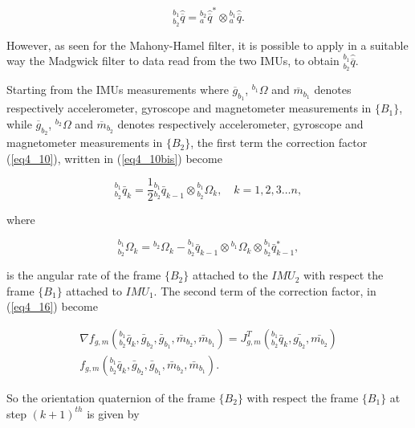 \begin{equation}
\label{eq4_18}
{^{b_1}_{b_2}\hat{\overline{q}}} = {_{a}^{b_2}\hat{\overline{q}}^{*}} \otimes {_{a}^{b_1}\hat{\overline{q}}}.
\end{equation}   

However, as seen for the Mahony-Hamel filter, it is possible to apply in a suitable way the Madgwick filter to data read from the two IMUs, to obtain ${^{b_1}_{b_2}\hat{\overline{q}}}$.

Starting from the IMUs measurements where $\overline{g}_{b_1}$, $^{b_1} \Omega$ and $\overline{m}_{b_1}$ denotes respectively accelerometer, gyroscope and magnetometer measurements in $\{ B_1 \}$,  while $\overline{g}_{b_2}$, $^{b_2} \Omega$ and $\overline{m}_{b_2}$ denotes respectively accelerometer, gyroscope and magnetometer measurements in $\{ B_2 \}$, the first term the correction factor (\ref{eq4_10}), written in (\ref{eq4_10bis}) become

\begin{equation}
\label{eq4_19}
^{b_1}_{b_2} \bar{q}_k = \frac{1}{2} {^{b_1}_{b_2} \bar{q}_{k-1}} \otimes {^{b_1}_{b_2} \Omega_k},  \quad k = 1,2,3 \dots n,
\end{equation}

\noindent where 

\begin{equation}
\label{eq4_20}
{^{b_1}_{b_2} \Omega_k} = {^{b_2} \Omega_k} - {^{b_1}_{b_2} \bar{q}_{k-1}} \otimes {^{b_1} \Omega_k} \otimes {^{b_1}_{b_2} \bar{q}^{*}_{k-1}},
\end{equation}

\noindent is the angular rate of the frame $\{ B_2 \}$ attached to the $IMU_2$ with respect the frame $\{ B_1 \}$ attached to $IMU_1$. The second term of the correction factor, in (\ref{eq4_16}) become

\begin{equation}
\begin{split}
\label{eq4_21}
\nabla f_{g,m}(^{b_1}_{b_2} \bar{q}_k,\bar{g}_{b_2},\bar{g}_{b_1},\bar{m}_{b_2},\bar{m}_{b_1}) = J_{g,m}^T(^{b_1}_{b_2} \bar{q}_k, \bar{g_{b_2}},\bar{m_{b_2}}) \\ {f}_{g,m}(^{b_1}_{b_2} \bar{q}_k,\bar{g}_{b_2},\bar{g}_{b_1},\bar{m}_{b_2},\bar{m}_{b_1}).
\end{split}
\end{equation}

\noindent So the orientation quaternion of the frame $\{ B_2 \}$ with respect the frame ${\{ B_1 \}}$ at step $(k+1)^{th}$ is given by

